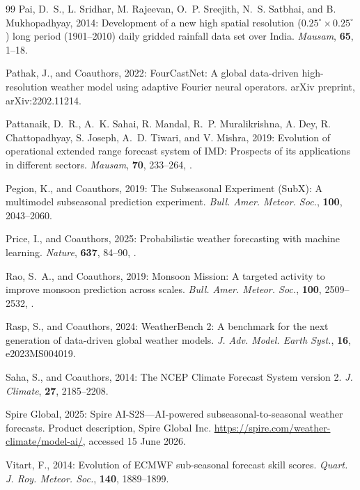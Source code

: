 \begin{thebibliography}{99}
Pai, D.~S., L. Sridhar, M. Rajeevan, O.~P. Sreejith, N.~S. Satbhai,
and B. Mukhopadhyay, 2014: Development of a new high spatial
resolution ($0.25^{\circ} \times 0.25^{\circ}$) long period
(1901--2010) daily gridded rainfall data set over India.
\textit{Mausam}, \textbf{65}, 1--18.

Pathak, J., and Coauthors, 2022: FourCastNet: A global data-driven
high-resolution weather model using adaptive Fourier neural
operators. arXiv preprint, arXiv:2202.11214.

Pattanaik, D.~R., A.~K. Sahai, R. Mandal, R.~P. Muralikrishna,
A. Dey, R. Chattopadhyay, S. Joseph, A.~D. Tiwari, and V. Mishra,
2019: Evolution of operational extended range forecast system of IMD:
Prospects of its applications in different sectors.
\textit{Mausam}, \textbf{70}, 233--264,
.

Pegion, K., and Coauthors, 2019: The Subseasonal Experiment (SubX):
A multimodel subseasonal prediction experiment. \textit{Bull. Amer.
Meteor. Soc.}, \textbf{100}, 2043--2060.

Price, I., and Coauthors, 2025: Probabilistic weather forecasting
with machine learning. \textit{Nature}, \textbf{637}, 84--90,
.

Rao, S.~A., and Coauthors, 2019: Monsoon Mission: A targeted activity
to improve monsoon prediction across scales. \textit{Bull. Amer.
Meteor. Soc.}, \textbf{100}, 2509--2532,
.

Rasp, S., and Coauthors, 2024: WeatherBench 2: A benchmark for the
next generation of data-driven global weather models. \textit{J. Adv.
Model. Earth Syst.}, \textbf{16}, e2023MS004019.

Saha, S., and Coauthors, 2014: The NCEP Climate Forecast System
version 2. \textit{J. Climate}, \textbf{27}, 2185--2208.

Spire Global, 2025: Spire AI-S2S---AI-powered subseasonal-to-seasonal
weather forecasts. Product description, Spire Global Inc.
\url{https://spire.com/weather-climate/model-ai/}, accessed 15 June 2026.

Vitart, F., 2014: Evolution of ECMWF sub-seasonal forecast skill
scores. \textit{Quart. J. Roy. Meteor. Soc.}, \textbf{140},
1889--1899.


\end{thebibliography}
